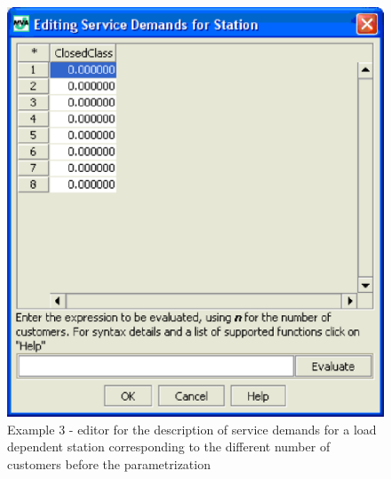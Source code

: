 \begin{figure}[htbp]
    \begin{center}
        \includegraphics[scale=.5]{img/jmva/example3ldBefore}
    \end{center}
    \caption{Example 3 - editor for the description of service
    demands for a load dependent station corresponding to the different number of
    customers before the parametrization}
    \label{fig:jmva:example3ldBefore}
\end{figure}

